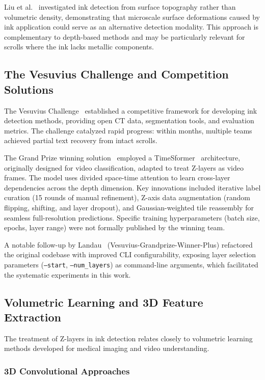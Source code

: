Liu et al.~\cite{liu2024ink} investigated ink detection from surface topography rather than volumetric density, demonstrating that microscale surface deformations caused by ink application could serve as an alternative detection modality. This approach is complementary to depth-based methods and may be particularly relevant for scrolls where the ink lacks metallic components.

\subsection{The Vesuvius Challenge and Competition Solutions}

The Vesuvius Challenge~\cite{vesuvius2023challenge} established a competitive framework for developing ink detection methods, providing open CT data, segmentation tools, and evaluation metrics. The challenge catalyzed rapid progress: within months, multiple teams achieved partial text recovery from intact scrolls.

The Grand Prize winning solution~\cite{nader2024gp, naderink2024blog} employed a TimeSformer~\cite{bertasius2021timesformer} architecture, originally designed for video classification, adapted to treat Z-layers as video frames. The model uses divided space-time attention to learn cross-layer dependencies across the depth dimension. Key innovations included iterative label curation (15 rounds of manual refinement), Z-axis data augmentation (random flipping, shifting, and layer dropout), and Gaussian-weighted tile reassembly for seamless full-resolution predictions. Specific training hyperparameters (batch size, epochs, layer range) were not formally published by the winning team.

A notable follow-up by Landau~\cite{landau2024gpplus} (Vesuvius-Grandprize-Winner-Plus) refactored the original codebase with improved CLI configurability, exposing layer selection parameters (\texttt{--start}, \texttt{--num\_layers}) as command-line arguments, which facilitated the systematic experiments in this work.

\subsection{Volumetric Learning and 3D Feature Extraction}

The treatment of Z-layers in ink detection relates closely to volumetric learning methods developed for medical imaging and video understanding.

\subsubsection{3D Convolutional Approaches}

